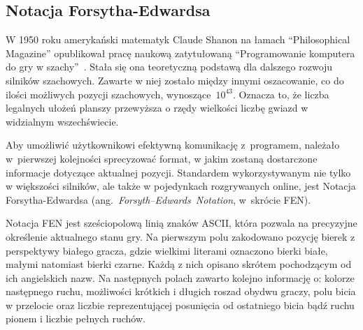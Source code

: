 \subsection{Notacja Forsytha-Edwardsa}
\label{subsec:notacja-fen}


W 1950 roku amerykański matematyk Claude Shanon na łamach \enquote{Philosophical Magazine} opublikował pracę naukową zatytułowaną \enquote{Programowanie komputera do gry w szachy}~\cite*{Shannon1950XXIIPA}.
Stała się ona teoretyczną podstawą dla dalszego rozwoju silników szachowych.
Zawarte w niej zostało między innymi oszacowanie, co do ilości możliwych pozycji szachowych, wynoszące~$10^{43}$.
Oznacza to, że liczba legalnych ułożeń planszy przewyższa o rzędy wielkości liczbę gwiazd w widzialnym wszechświecie.

Aby umożliwić użytkownikowi efektywną komunikację z~programem, należało w~pierwszej kolejności sprecyzować format, w jakim zostaną dostarczone informacje dotyczące aktualnej pozycji.
Standardem wykorzystywanym nie tylko w większości silników, ale także w pojedynkach rozgrywanych online, jest Notacja Forsytha-Edwardsa (ang.~\emph{Forsyth–Edwards~Notation}, w~skrócie FEN).

Notacja FEN jest sześciopolową linią znaków ASCII, która pozwala na precyzyjne określenie aktualnego stanu gry.
Na pierwszym polu zakodowano pozycję bierek z perspektywy białego gracza, gdzie wielkimi literami oznaczono bierki białe, małymi natomiast bierki czarne.
Każdą z nich opisano skrótem pochodzącym od ich angielskich nazw.
Na następnych polach zawarto kolejno informację o: kolorze następnego ruchu, możliwości krótkich i długich roszad obydwu graczy, polu bicia w przelocie oraz liczbie reprezentującej posunięcia od ostatniego bicia bądź ruchu pionem i liczbie pełnych ruchów.

